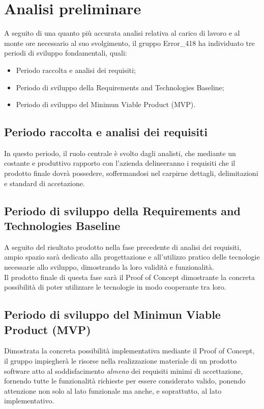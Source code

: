 \documentclass[a4paper, twoside]{article}
\begin{document}
\large

\newpage %



\section{Analisi preliminare}
\large{A seguito di una quanto più accurata analisi relativa al carico di lavoro e al monte ore necessario al suo svolgimento, il gruppo Error\_418 ha individuato tre periodi di sviluppo fondamentali, quali:}
\begin{itemize}
    \item Periodo raccolta e analisi dei requisiti;
    \item Periodo di sviluppo della Requirements and Technologies Baseline;
    \item Periodo di sviluppo del Minimun Viable Product (MVP).
\end{itemize}

\subsection{Periodo raccolta e analisi dei requisiti}
In questo periodo, il ruolo centrale è svolto dagli analisti, che mediante un costante e produttivo rapporto con l'azienda delineeranno i requisiti che il prodotto finale dovrà possedere, soffermandosi nel carpirne dettagli, delimitazioni e standard di accetazione.

\subsection{Periodo di sviluppo della Requirements and Technologies Baseline}
A seguito del risultato prodotto nella fase precedente di analisi dei requisiti, ampio spazio sarà dedicato alla progettazione e all'utilizzo pratico delle tecnologie necessarie allo sviluppo, dimostrando la loro validità e funzionalità. \\
Il prodotto finale di questa fase sarà il Proof of Concept dimostrante la concreta possibilità di poter utilizzare le tecnologie in modo cooperante tra loro.

\subsection{Periodo di sviluppo del Minimun Viable Product (MVP)}
Dimostrata la concreta possibilità implementativa mediante il Proof of Concept, il gruppo impiegherà le risorse nella realizzazione materiale di un prodotto software atto al soddisfacimento \textit{almeno} dei requisiti minimi di accettazione, fornendo tutte le funzionalità richieste per essere considerato valido, ponendo attenzione non solo al lato funzionale ma anche, e soprattutto, al lato implementativo.
\end{document}
